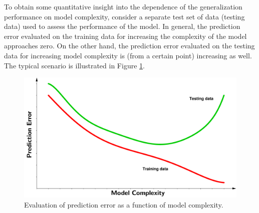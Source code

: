 To obtain some quantitative insight into the dependence of the generalization performance on model complexity, consider a separate test set of data (testing data) used to assess the performance of the model. 
In general, the prediction error evaluated on the training data for increasing the complexity of the model approaches zero. On the other hand, the prediction error evaluated on the testing data for increasing model complexity is (from a certain point) increasing as well. The typical scenario is illustrated in Figure \ref{fig:Prediction_error}.
 \begin{figure}[h]
	\centering
	\includegraphics[width=16.0cm]{plots/Images/PE3.pdf}
	\caption{Evaluation of prediction error as a function of model complexity.}%
	\label{fig:Prediction_error}%
\end{figure}


 
